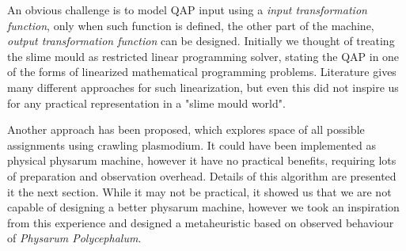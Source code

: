 An obvious challenge is to model QAP input using a \textit{input transformation function}, only when such function is defined, the other part of the machine, \textit{output transformation function} can be designed. Initially we thought of treating the slime mould as restricted linear programming solver, stating the QAP in one of the forms of linearized mathematical programming problems. Literature gives many different approaches for such linearization, but even this did not inspire us for any practical representation in a "slime mould world".

Another approach has been proposed, which explores space of all possible assignments using crawling plasmodium. It could have been implemented as physical physarum machine, however it have no practical benefits, requiring lots of preparation and observation overhead. Details of this algorithm are presented it the next section. While it may not be practical, it showed us that we are not capable of designing a better physarum machine, however we took an inspiration from this experience and designed a metaheuristic based on observed behaviour of \textit{Physarum Polycephalum}.




